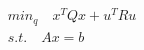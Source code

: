 \documentclass[preview]{standalone}
\begin{document}
\begin{align*}
min_{q} \quad x^TQx + u^T R u \\ s.t. \quad Ax = b
\end{align*}
\end{document}
